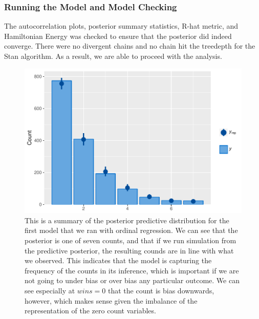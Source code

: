 \documentclass[10pt,a4paper, hidelinks]{article} %
\begin{document}
%

\subsubsection{Running the Model and Model Checking}

The autocorrelation plots, posterior summary statistics, R-hat metric, and Hamiltonian Energy was checked to ensure that the posterior did indeed converge. There were no divergent chains and no chain hit the treedepth for the Stan algorithm. As a result, we are able to proceed with the analysis.


\begin{figure}[H]
	\centering
	\includegraphics[width=0.7\linewidth]{../fig/polr_nonames_pp}
	\caption{This is a summary of the posterior predictive distribution for the first model that we ran with ordinal regression. We can see that the posterior is one of seven counts, and that if we run simulation from the predictive posterior, the resulting counds are in line with what we observed. This indicates that the model is capturing the frequency of the counts in its inference, which is important if we are not going to under bias or over bias any particular outcome. We can see especially at $wins = 0$ that the count is bias downwards, however, which makes sense given the imbalance of the representation of the zero count variables.}
	\label{fig:polrnonamespp}
\end{figure}
\end{document}
